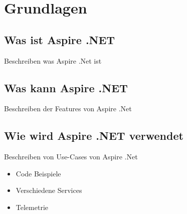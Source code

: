\section{Grundlagen}

\subsection{Was ist Aspire .NET}
Beschreiben was Aspire .Net ist

\subsection{Was kann Aspire .NET}
Beschreiben der Features von Aspire .Net

\subsection{Wie wird Aspire .NET verwendet}
Beschreiben von Use-Cases von Aspire .Net

\begin{itemize}
    \item Code Beispiele
    \item Verschiedene Services
    \item Telemetrie
\end{itemize}
